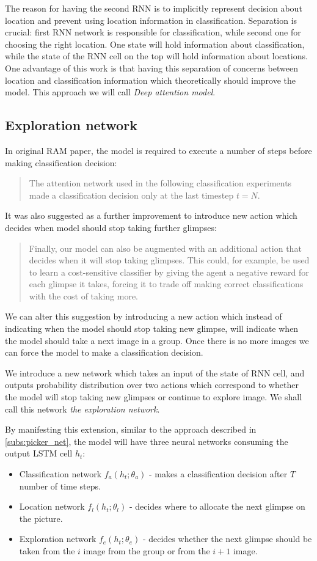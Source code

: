 The reason for having the second RNN is to implicitly
represent decision about location and
prevent using location information in classification. Separation is crucial:
first RNN network is responsible for
classification, while second one for choosing the right location.
One state will hold information about classification, while the state of
the RNN cell on the top will hold information about locations.
One advantage of this work is that having this separation of concerns between
location and classification information which theoretically should improve the model.
This approach we will call \emph{Deep attention model}.

\subsection{Exploration network}
In original RAM paper, the model is required to execute a number of
steps before making classification decision:
\blockquote{
The attention network used in the following classification experiments made
a classification decision only at the last timestep $t = N$.
}\cite{DBLP:journals/corr/MnihHGK14}
It was also suggested as a further improvement to introduce new action
which decides when model should stop taking further glimpses:
\blockquote{
Finally, our model can also be augmented with an additional action that decides
when it will stop taking glimpses. This could, for example, be used to learn a
cost-sensitive classifier by giving the agent a negative reward for each glimpse
it takes, forcing it to trade off making correct classifications with the cost of
taking more. \cite{DBLP:journals/corr/MnihHGK14}
}

We can alter this suggestion by introducing a new action which
instead of indicating when the model should stop taking new glimpse, will
indicate when the model should take a next image in a group. Once there is no more images
we can force the model to make a classification decision.

We introduce a new network which takes an input of the state of RNN cell, and outputs
probability distribution over two actions which correspond to whether the model
will stop taking new glimpses
or continue to explore image.
We shall call this network \emph{the exploration network}.

By manifesting
this extension, similar to the approach described in \autoref{subs:picker_net},
the model will have three neural networks consuming
the output LSTM cell $h_t$:
\begin{itemize}
	\item Classification network $f_a(h_t; \theta_a)$ - makes a classification
		decision after $T$ number of time steps.
	\item Location network $f_l(h_t; \theta_l)$ - decides where to allocate the next glimpse
	on the picture.
	\item Exploration network $f_e(h_t; \theta_e)$ - decides whether the next glimpse
	should be taken
	from the $i$ image from the group or from the $i+1$ image.
\end{itemize}

